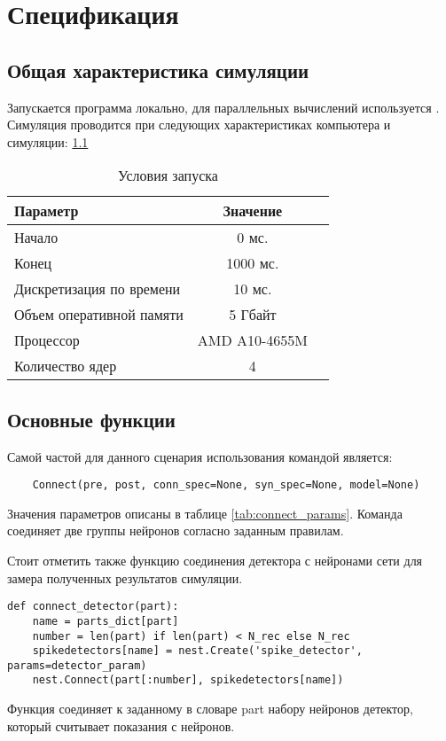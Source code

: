 \chapter{Спецификация}
\label{chap:specification}
\section{Общая характеристика симуляции}
Запускается программа локально, для параллельных вычислений используется .
Симуляция проводится при следующих характеристиках компьютера и симуляции: \ref{tab:conditions}

\begin{table}
	\caption{Условия запуска}
	\label{tab:conditions}
	\begin{tabular}{l c r}
		\toprule
		Параметр & Значение \\
		\midrule
		Начало & 0 мс. \\
		Конец & 1000 мс. \\
		Дискретизация по времени & 10 мс. \\
		Объем оперативной памяти & 5 Гбайт \\
		Процессор & AMD A10-4655M \\
		Количество ядер & 4 \\
		\bottomrule
	\end{tabular}
\end{table}

\section{Основные функции}
Самой частой для данного сценария использования командой является: 
\begin{lstlisting}
	Connect(pre, post, conn_spec=None, syn_spec=None, model=None)
\end{lstlisting}
Значения параметров описаны в таблице \ref{tab:connect_params}. 
Команда соединяет две группы нейронов согласно заданным правилам.

Стоит отметить также функцию соединения детектора с нейронами сети для замера полученных результатов симуляции.
\begin{lstlisting}
def connect_detector(part):
	name = parts_dict[part]
	number = len(part) if len(part) < N_rec else N_rec
	spikedetectors[name] = nest.Create('spike_detector', params=detector_param)
	nest.Connect(part[:number], spikedetectors[name])
\end{lstlisting}
Функция соединяет к заданному в словаре part набору нейронов детектор, который считывает показания с  нейронов.

